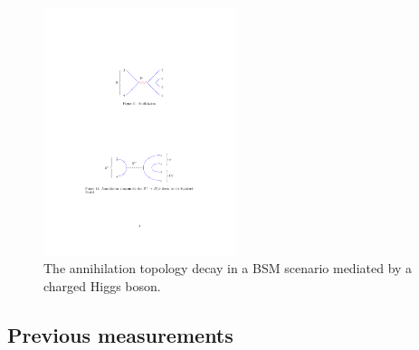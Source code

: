 \begin{figure}[!h]
    \centering
    \includegraphics[width=0.5\textwidth]{figs/Theory/B2DsPhi_Higgs.pdf}
    \caption{The annihilation topology decay \decay{\Bp}{\Dsp\phiz} in a BSM scenario mediated by a charged Higgs boson. }
    \label{fig:Theory_DsPhiDiagram_Higgs}   
\end{figure}




\subsection{Previous measurements}

